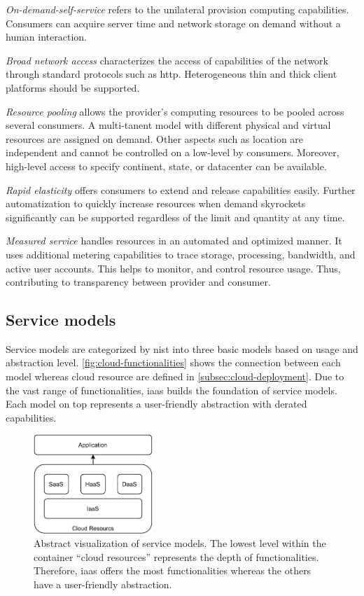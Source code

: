 \textit{On-demand-self-service} refers to the unilateral provision computing capabilities.
Consumers can acquire server time and network storage on demand without a human interaction.

\textit{Broad network access} characterizes the access of capabilities of the network through standard protocols such as \acs{http}.
Heterogeneous thin and thick client platforms should be supported.

\textit{Resource pooling} allows the provider's computing resources to be pooled across several consumers.
A multi-tanent model with different physical and virtual resources are assigned on demand.
Other aspects such as location are independent and cannot be controlled on a low-level by consumers.
Moreover, high-level access to specify continent, state, or datacenter can be available.

\textit{Rapid elasticity} offers consumers to extend and release capabilities easily.
Further automatization to quickly increase resources  when demand skyrockets significantly can be supported regardless of the limit and quantity at any time.

\textit{Measured service} handles resources in an automated and optimized manner.
It uses additional metering capabilities to trace storage, processing, bandwidth, and active user accounts.
This helps to monitor, and control resource usage. Thus, contributing to transparency between provider and consumer.

\subsection{Service models}
\label{subsec:cloud-service}

Service models are categorized by \ac{nist} into three basic models based on usage and abstraction level.
\autoref{fig:cloud-functionalities} shows the connection between each model whereas cloud resource are defined in \autoref{subsec:cloud-deployment}.
Due to the vast range of functionalities, \ac*{iaas} builds the foundation of service models.
Each model on top represents a user-friendly abstraction with derated capabilities.

\begin{figure}[ht]
    \centering
    \includegraphics[width=0.4\textwidth]{figures/cloud-service-models.pdf}
    \caption[Abstract visualization of service models]{
        Abstract visualization of service models.
        The lowest level within the container \enquote{cloud resources} represents the depth of functionalities.
        Therefore, \ac{iaas} offers the most functionalities whereas the others have a user-friendly abstraction.
    }
    \label{fig:cloud-functionalities}
\end{figure}

